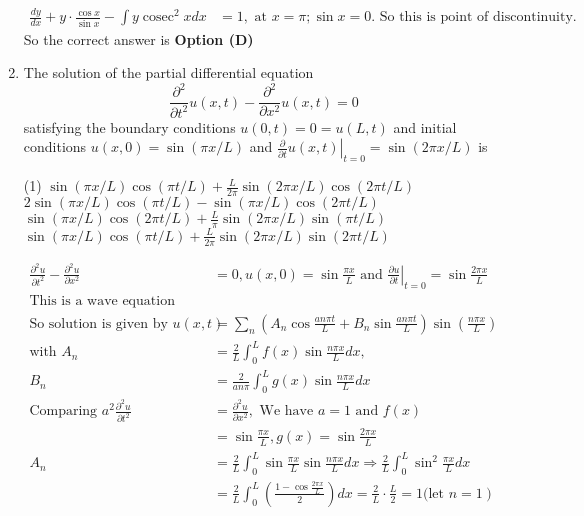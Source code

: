 \begin{enumerate}[label=\color{ocre}\textbf{\arabic*.}]
\begin{answer}
\begin{align*}
	\frac{d y}{d x}+y \cdot \frac{\cos x}{\sin x}-\int y \operatorname{cosec}^{2} x d x&=1,\text{ at }x=\pi ; \sin x=0 .\text{ So this is point of discontinuity.}
	\end{align*}
	So the correct answer is \textbf{Option (D)}
\end{answer}
\item The solution of the partial differential equation
$$
\frac{\partial^{2}}{\partial t^{2}} u(x, t)-\frac{\partial^{2}}{\partial x^{2}} u(x, t)=0
$$
satisfying the boundary conditions $u(0, t)=0=u(L, t)$ and initial conditions $u(x, 0)=\sin (\pi x / L)$ and $\left.\frac{\partial}{\partial t} u(x, t)\right|_{t=0}=\sin (2 \pi x / L)$ is
{}
	\begin{tasks}(1)
		\task[\textbf{A.}] $\sin (\pi x / L) \cos (\pi t / L)+\frac{L}{2 \pi} \sin (2 \pi x / L) \cos (2 \pi t / L)$
		\task[\textbf{B.}] $2 \sin (\pi x / L) \cos (\pi t / L)-\sin (\pi x / L) \cos (2 \pi t / L)$
		\task[\textbf{C.}] $\sin (\pi x / L) \cos (2 \pi t / L)+\frac{L}{\pi} \sin (2 \pi x / L) \sin (\pi t / L)$
		\task[\textbf{D.}] $\sin (\pi x / L) \cos (\pi t / L)+\frac{L}{2 \pi} \sin (2 \pi x / L) \sin (2 \pi t / L)$
	\end{tasks}
	\begin{answer}
		\begin{align*}
		\frac{\partial^{2} u}{\partial t^{2}}-\frac{\partial^{2} u}{\partial x^{2}}&=0, u(x, 0)=\sin \frac{\pi x}{L}\text{ and }\left.\frac{\partial u}{\partial t}\right|_{t=0}=\sin \frac{2 \pi x}{L}\\
		\text{This is a wave equation}\\
		\text{So solution is given by }u(x, t)&=\sum_{n}\left(A_{n} \cos \frac{a n \pi t}{L}+B_{n} \sin \frac{a n \pi t}{L}\right) \sin \left(\frac{n \pi x}{L}\right)\\
		\text{with }A_{n}&=\frac{2}{L} \int_{0}^{L} f(x) \sin \frac{n \pi x}{L} d x, \\ B_{n}&=\frac{2}{a n \pi} \int_{0}^{L} g(x) \sin \frac{n \pi x}{L} d x\\
		\text{Comparing }a^{2} \frac{\partial^{2} u}{\partial t^{2}}&=\frac{\partial^{2} u}{\partial x^{2}},\text{ We have }a=1\text{ and }f(x)\\&=\sin \frac{\pi x}{L}, g(x)=\sin \frac{2 \pi x}{L}\\
		A_{n}&=\frac{2}{L} \int_{0}^{L} \sin \frac{\pi x}{L} \sin \frac{n \pi x}{L} d x \Rightarrow \frac{2}{L} \int_{0}^{L} \sin ^{2} \frac{\pi x}{L} d x\\&=\frac{2}{L} \int_{0}^{L}\left(\frac{1-\cos \frac{2 \pi x}{L}}{2}\right) d x=\frac{2}{L} \cdot \frac{L}{2}=1 (\text{let }\left.n=1\right)\\

\end{align*}
\end{answer}
\end{enumerate}
